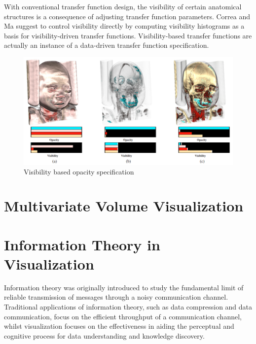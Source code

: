 With conventional transfer function design, the visibility of certain anatomical structures is a consequence of adjusting transfer function parameters. 
Correa and Ma suggest to control visibility directly by computing visibility histograms as a basis for visibility-driven transfer functions. Visibility-based transfer functions are actually an instance of a data-driven transfer function specification.

\cite{bordoloi_view_2005}
\cite{takahashi_feature-driven_2005}

\cite{emsenhuber_visibility_2008}
\cite{correa_visibility_2011}
\cite{wang_efficient_2011}

\begin{figure}
	\centering
	\includegraphics[width=1\linewidth]{images/wang_efficient_2011}
	\caption{Visibility based opacity specification \cite{wang_efficient_2011}}
	\label{fig:wang_efficient_2011}
\end{figure}

\cite{bronstad_visibility_2012}

\cite{jung_visibility-driven_2013}
\cite{zheng_visibility_2013}
\cite{ruiz_automatic_2011}
\cite{bramon_information_2013}

\cite{zhou_opacity_2014}

\section{Multivariate Volume Visualization}
\cite{kniss_volume_2002}
\cite{woodring_multi-variate_2006}
\cite{akiba_visualizing_2007}
\cite{lee_visualization_2009}
\cite{guo_scalable_2012}
\cite{khlebnikov_noise-based_2013}
\cite{liu_multivariate_2014}

\section{Information Theory in Visualization}
Information theory \cite{shannon_mathematical_1948} was originally introduced to study the fundamental limit of reliable transmission of messages through a noisy communication channel. Traditional applications of information theory, such as data compression and data communication, focus on the efficient throughput of a communication channel, whilst visualization focuses on the effectiveness in aiding the perceptual and cognitive process for data understanding and knowledge discovery.

